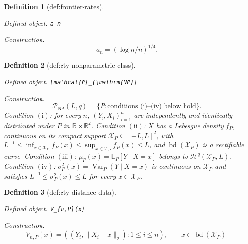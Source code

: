 \documentclass{article}
\newtheorem{definition}{Definition}
\begin{document}
\begin{definition}[def:frontier-rates]\label{def:frontier-rates}
\par\smallskip\noindent\emph{Defined object.} \texttt{a\_\allowbreak{}n}
\par\smallskip\noindent\emph{Construction.} \[a_n=(\log n/n)^{1/4}.\]
\end{definition}

\begin{definition}[def:cty-nonparametric-class]\label{def:cty-nonparametric-class}
\par\smallskip\noindent\emph{Defined object.} \texttt{\textbackslash{}\allowbreak{}mathcal\{P\}\allowbreak{}\_\allowbreak{}\{\textbackslash{}\allowbreak{}mathrm\{NP\}\allowbreak{}\}\allowbreak{}}
\par\smallskip\noindent\emph{Construction.} \[\mathcal P_{\mathrm{NP}}(L,q)=\bigl\{P:\text{conditions (i)--(iv) below hold}\bigr\}.\]
Condition \(\mathrm{(i)}\): for every \(n\), \((Y_i,X_i)_{i=1}^n\) are independently and identically distributed under \(P\) in \(\mathbb R\times\mathbb R^2\).  Condition \(\mathrm{(ii)}\): \(X\) has a Lebesgue density \(f_P\), continuous on its compact support \(\mathcal X_P\subseteq[-L,L]^2\), with \(L^{-1}\leq\inf_{x\in\mathcal X_P}f_P(x)\leq\sup_{x\in\mathcal X_P}f_P(x)\leq L\), and \(\operatorname{bd}(\mathcal X_P)\) is a rectifiable curve.  Condition \(\mathrm{(iii)}\): \(\mu_P(x)=\mathbb E_P[Y\mid X=x]\) belongs to \(\mathcal H^q(\mathcal X_P,L)\).  Condition \(\mathrm{(iv)}\): \(\sigma_P^2(x)=\operatorname{Var}_P(Y\mid X=x)\) is continuous on \(\mathcal X_P\) and satisfies \(L^{-1}\leq\sigma_P^2(x)\leq L\) for every \(x\in\mathcal X_P\).
\end{definition}

\begin{definition}[def:cty-distance-data]\label{def:cty-distance-data}
\par\smallskip\noindent\emph{Defined object.} \texttt{V\_\allowbreak{}\{n,\allowbreak{}P\}\allowbreak{}(x)}
\par\smallskip\noindent\emph{Construction.} \[V_{n,P}(x)=((Y_i,\lVert X_i-x\rVert_2):1\leq i\leq n),\qquad x\in\operatorname{bd}(\mathcal X_P).\]
\end{definition}
\end{document}
